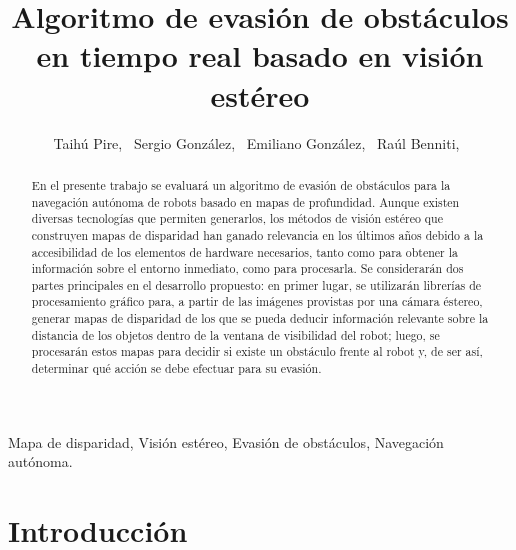 \documentclass[journal]{IEEEtran}
\begin{document}
%
\title{Algoritmo de evasi\'on de obst\'aculos en tiempo real basado en visi\'on est\'ereo}

\author{Taih\'u Pire,~
        Sergio Gonz\'alez,~
        Emiliano Gonz\'alez,~
        Ra\'ul Benniti,~%
        }


\maketitle


\begin{abstract}
En el presente trabajo se evaluar\'a un algoritmo de evasi\'on de obst\'aculos para la navegaci\'on aut\'onoma de robots basado en mapas de profundidad. Aunque existen diversas tecnolog\'ias que permiten generarlos, los m\'etodos de visi\'on est\'ereo que construyen mapas de disparidad han ganado relevancia en los \'ultimos a\~nos debido a la accesibilidad de los elementos de hardware necesarios, tanto como para obtener la informaci\'on sobre el entorno inmediato, como para procesarla. Se considerar\'an dos partes principales en el desarrollo propuesto: en primer lugar, se utilizar\'an librer\'ias de procesamiento gr\'afico para, a partir de las im\'agenes provistas por una c\'amara \'estereo, generar mapas de disparidad de los que se pueda deducir informaci\'on relevante sobre la distancia de los objetos dentro de la ventana de visibilidad del robot; luego, se procesar\'an estos mapas para decidir si existe un obst\'aculo frente al robot y, de ser as\'i, determinar qu\'e acci\'on se debe efectuar para su evasi\'on.
\end{abstract}

\begin{IEEEkeywords}
Mapa de disparidad, Visi\'on est\'ereo, Evasi\'on de obst\'aculos, Navegaci\'on aut\'onoma.
\end{IEEEkeywords}


\IEEEpeerreviewmaketitle


\section{Introducci\'on}
\end{document}

